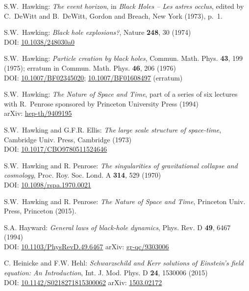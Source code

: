 \begin{thebibliography}{123}
S.W.~Hawking: {\em The event horizon},
in {\em Black Holes -- Les astres occlus}, edited by C.~DeWitt and B.~DeWitt,
Gordon and Breach, New York (1973), p.~1.

S.W.~Hawking: {\em Black hole explosions?},
Nature {\bf 248}, 30 (1974)\\
DOI: \href{https://doi.org/10.1038/248030a0}{10.1038/248030a0}

S.W.~Hawking: {\em Particle creation by black holes},
Commun. Math. Phys. {\bf 43}, 199 (1975); erratum
in Commun. Math. Phys. {\bf 46}, 206 (1976) \\
DOI: \href{https://doi.org/10.1007/BF02345020}{10.1007/BF02345020};
\href{https://doi.org/10.1007/BF01608497}{10.1007/BF01608497} (erratum)

S.W.~Hawking: {\em The Nature of Space and Time}, part of a series of six lectures with
R.~Penrose sponsored by Princeton University Press (1994)\\
arXiv: \href{https://arxiv.org/abs/hep-th/9409195}{hep-th/9409195}

S.W.~Hawking and G.F.R. Ellis: {\em The large scale structure of
space-time},
Cambridge Univ. Press, Cambridge (1973)\\
DOI: \href{https://doi.org/10.1017/CBO9780511524646}{10.1017/CBO9780511524646}

S.W.~Hawking and R. Penrose: {\em The singularities of gravitational collapse and cosmology},
Proc. Roy. Soc. Lond. A {\bf 314}, 529 (1970)\\
DOI: \href{https://doi.org/10.1098/rspa.1970.0021}{10.1098/rspa.1970.0021}

S.W.~Hawking and R. Penrose: {\em The Nature of Space and Time},
Princeton Univ. Press, Princeton (2015).

S.A. Hayward:
{\em General laws of black-hole dynamics},
Phys. Rev. D {\bf 49}, 6467 (1994)\\
DOI: \href{https://doi.org/10.1103/PhysRevD.49.6467}{10.1103/PhysRevD.49.6467}\hfill
arXiv: \href{https://arxiv.org/abs/gr-qc/9303006}{gr-qc/9303006}

C. Heinicke and F.W. Hehl:
{\em Schwarzschild and Kerr solutions of Einstein's field equation: An Introduction},
Int. J. Mod. Phys. D {\bf 24}, 1530006 (2015)\\
DOI: \href{https://doi.org/10.1142/S0218271815300062}{10.1142/S0218271815300062}\hfill
arXiv: \href{https://arxiv.org/abs/1503.02172}{1503.02172}


\end{thebibliography}
